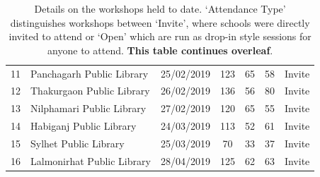 \documentclass[12pt]{report} %
\begin{document}
\begin{table}[ht]
\begin{tabular}{l l c c c c c}
11 & Panchagarh Public Library & 25/02/2019 & 123 & 65 & 58  & Invite\\
12 & Thakurgaon Public Library & 26/02/2019 & 136 & 56 & 80 & Invite\\
13 & Nilphamari Public Library & 27/02/2019 & 120  & 65  & 55 & Invite\\
14 & Habiganj Public Library & 24/03/2019 & 113  & 52  & 61 & Invite\\
15 & Sylhet Public Library & 25/03/2019 & 70  & 33  & 37 & Invite\\
16 & Lalmonirhat Public Library & 28/04/2019 & 125 & 62  & 63 & Invite\\
\hline%
\end{tabular}
\caption{Details on the workshops held to date. `Attendance Type' distinguishes workshops between `Invite', where schools were directly invited to attend or `Open' which are run as drop-in style sessions for anyone to attend. \textbf{This table continues overleaf}.} %
\label{tab:workshops} %
\end{table}
\end{document}

